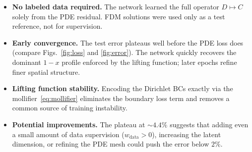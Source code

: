\documentclass[11pt]{article}
\begin{document}
\begin{itemize}
  \item \textbf{No labeled data required.}  The network learned the full
        operator $D \mapsto C$ solely from the PDE residual.  FDM
        solutions were used only as a test reference, not for supervision.

  \item \textbf{Early convergence.}  The test error plateaus well before
        the PDE loss does (compare Figs.~\ref{fig:loss} and
        \ref{fig:error}).  The network quickly recovers the dominant
        $1-x$ profile enforced by the lifting function; later epochs
        refine finer spatial structure.

  \item \textbf{Lifting function stability.}  Encoding the Dirichlet BCs
        exactly via the mollifier~\eqref{eq:mollifier} eliminates the
        boundary loss term and removes a common source of training
        instability.

  \item \textbf{Potential improvements.}  The plateau at $\sim 4.4\%$
        suggests that adding even a small amount of data supervision
        ($w_\text{data} > 0$), increasing the latent dimension, or
        refining the PDE mesh could push the error below $2\%$.
\end{itemize}
\end{document}

